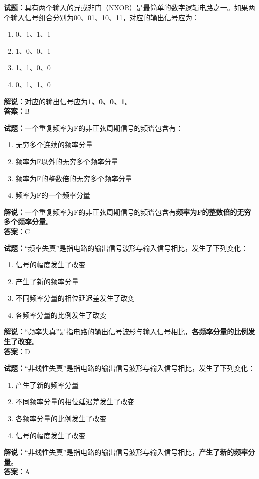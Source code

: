 \documentclass{ctexbook}
\begin{document}
\vspace{1em}

\textbf{试题：}具有两个输入的异或非门（NXOR）是最简单的数字逻辑电路之一。如果两个输入信号组合分别为00、01、10、11，对应的输出信号应为：
\begin{enumerate}[leftmargin=3em]
  \item 0、1、1、1
  \item 1、0、0、1
  \item 1、1、0、0
  \item 0、1、1、0
\end{enumerate}
\noindent\textbf{解说：}对应的输出信号应为\textbf{1、0、0、1}。\\\noindent\textbf{答案：}B

\vspace{1em}

\textbf{试题：}一个重复频率为F的非正弦周期信号的频谱包含有：
\begin{enumerate}[leftmargin=3em]
  \item 无穷多个连续的频率分量
  \item 频率为F以外的无穷多个频率分量
  \item 频率为F的整数倍的无穷多个频率分量
  \item 频率为F的一个频率分量
\end{enumerate}
\noindent\textbf{解说：}一个重复频率为F的非正弦周期信号的频谱包含有\textbf{频率为F的整数倍的无穷多个频率分量}。\\\noindent\textbf{答案：}C

\vspace{1em}

\textbf{试题：}“频率失真”是指电路的输出信号波形与输入信号相比，发生了下列变化：
\begin{enumerate}[leftmargin=3em]
  \item 信号的幅度发生了改变
  \item 产生了新的频率分量
  \item 不同频率分量的相位延迟差发生了改变
  \item 各频率分量的比例发生了改变
\end{enumerate}
\noindent\textbf{解说：}“频率失真”是指电路的输出信号波形与输入信号相比，\textbf{各频率分量的比例发生了改变}。\\\noindent\textbf{答案：}D


\vspace{1em}

\textbf{试题：}“非线性失真”是指电路的输出信号波形与输入信号相比，发生了下列变化：
\begin{enumerate}[leftmargin=3em]
  \item 产生了新的频率分量
  \item 不同频率分量的相位延迟差发生了改变
  \item 各频率分量的比例发生了改变
  \item 信号的幅度发生了改变
\end{enumerate}
\noindent\textbf{解说：}“非线性失真”是指电路的输出信号波形与输入信号相比，\textbf{产生了新的频率分量}。\\\noindent\textbf{答案：}A
\end{document}
